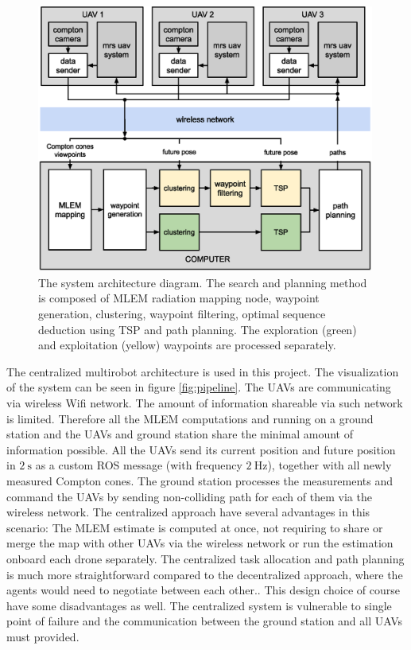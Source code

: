 \begin{figure}[!htb]
    \centering
    \includegraphics[width=0.99\textwidth]{./fig/photos/pipeline_main.eps}
    \caption{\centering The system architecture diagram. The search and planning method is composed of \ac{MLEM} radiation mapping node, waypoint generation, clustering, waypoint filtering, optimal sequence deduction using TSP and path planning. The exploration (green) and exploitation (yellow) waypoints are processed separately.}
    \label{fig:sysarch}
\end{figure}

The centralized multirobot architecture is used in this project.
The visualization of the system can be seen in figure \ref{fig:pipeline}.
The \ac{UAV}s are communicating via wireless \ac{Wifi} network.
The amount of information shareable via such network is limited.
Therefore all the \ac{MLEM} computations and running on a ground station and the \ac{UAV}s and ground station share the minimal amount of information possible.
All the \ac{UAV}s send its current position and future position in $\SI{2}\second$ as a custom \ac{ROS} message (with frequency $\SI{2}\hertz$), 
together with all newly measured Compton cones.
The ground station processes the measurements and command the \ac{UAV}s by sending non-colliding path for each of them via the wireless network.
The centralized approach have several advantages in this scenario:
The \ac{MLEM} estimate is computed at once, not requiring to share or merge the map with other \ac{UAV}s via the wireless network or run the estimation onboard each drone separately.
The centralized task allocation and path planning is much more straightforward compared to the decentralized approach, where the agents would need to negotiate between each other..
This design choice of course have some disadvantages as well.
The centralized system is vulnerable to single point of failure and the communication between the ground station and all \ac{UAV}s must provided. 

